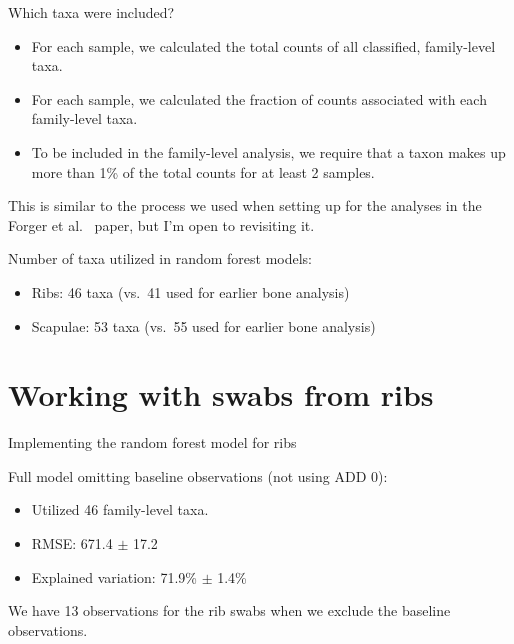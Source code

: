 \documentclass{beamer}
\begin{document}
\begin{frame}{Which taxa were included?}

  \begin{itemize}
  \item For each sample, we calculated the total counts of all classified,
family-level taxa.
  \item For each sample, we calculated the fraction of counts
associated with each family-level taxa. 
  \item To be included in the family-level analysis, we require that a taxon
  makes up more than 1\% of the total counts for at least 2 samples.
  \end{itemize}

  \vspace{0.1in}

  \noindent This is similar to the process we used when setting up for the
analyses in the Forger et al.~ paper, but I'm open to revisiting it.

  \vspace{0.1in}

  \noindent Number of taxa utilized in random forest models:
  \begin{itemize}
    \item Ribs: 46 taxa (vs.\ 41 used for earlier bone analysis)
    \item Scapulae: 53 taxa (vs.\ 55 used for earlier bone analysis)
  \end{itemize}


\end{frame}



\section[Rib swabs]{Working with swabs from ribs}


\begin{frame}{Implementing the random forest model for ribs}


  \noindent Full model omitting baseline observations (not using ADD 0):
  \begin{itemize}
    \item Utilized 46 family-level taxa.
    \item RMSE: 671.4 $\pm$ 17.2
    \item Explained variation: 71.9\% $\pm$ 1.4\%
  \end{itemize}

  \vspace{0.1in}

  \noindent We have 13 observations for the rib swabs when we exclude the
  baseline observations.

\end{frame}
\end{document}

